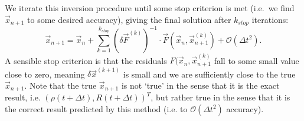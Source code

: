 \documentclass[12pt,twoside]{report}
\begin{document}
We iterate this inversion procedure until some stop criterion is met (i.e.\ we find $\vec{x}_{n+1}$ to some desired accuracy), giving the final solution after $k_{stop}$ iterations:
\begin{equation}
  \vec{x}_{n+1} =
  \vec{x}_n + \sum_{k=1}^{k_{stop}}
  (\delta \vec{F}^{(k)})^{-1} \cdot \vec{F}(\vec{x}_n, \vec{x}_{n+1}^{(k)})
  + \mathcal{O}(\Delta t^2).
\end{equation}
A sensible stop criterion is that the residuals $F(\vec{x}_n, \vec{x}_{n+1}^{(k)}$ fall to some small value close to zero, meaning $\delta\vec{x}^{(k+1)}$ is small and we are sufficiently close to the true $\vec{x}_{n+1}$.
Note that the true $\vec{x}_{n+1}$ is not `true' in the sense that it is the exact result, i.e. $(\rho(t + \Delta t), R(t + \Delta t))^T$, but rather true in the sense that it is the correct result predicted by this method (i.e. to $\mathcal{O}(\Delta t^2)$ accuracy).
\end{document}
